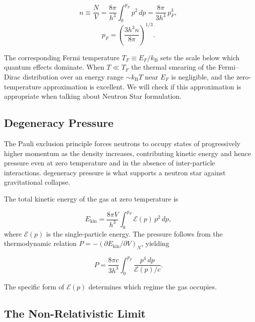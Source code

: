 \begin{equation}
    n \equiv \frac{N}{V}
      = \frac{8\pi}{h^3}\int_0^{p_F} p^2\,dp
      = \frac{8\pi}{3h^3}\,p_F^3,
    \label{eq:number-density}
\end{equation}
\begin{equation}
    p_F = \left(\frac{3h^3 n}{8\pi}\right)^{1/3}.
    \label{eq:fermi-momentum}
\end{equation}

The corresponding Fermi temperature $T_F \equiv E_F / k_{\mathrm{B}}$
sets the scale below which quantum effects dominate. When $T \ll T_F$
the thermal smearing of the Fermi--Dirac distribution over an energy
range ${\sim}k_{\mathrm{B}}T$ near $E_F$ is negligible, and the
zero-temperature approximation is excellent. We will check if this approximation is appropriate when talking about Neutron Star formulation.
 
\subsection{Degeneracy Pressure}
 
The Pauli exclusion principle forces neutrons to occupy states of
progressively higher momentum as the density increases, contributing
kinetic energy and hence pressure even at zero temperature and in the
absence of inter-particle interactions. degeneracy pressure
is what supports a neutron star against gravitational collapse.
 
The total kinetic energy of the gas at zero temperature is

\begin{equation}
    E_{\mathrm{kin}}
      = \frac{8\pi V}{h^3}\int_0^{p_F} \mathcal{E}(p)\,p^2\,dp,
    \label{eq:total-energy}
\end{equation}
%
where $\mathcal{E}(p)$ is the single-particle energy. The pressure
follows from the thermodynamic relation $P = -(\partial E_{\mathrm{kin}}/\partial V)_N$,
yielding

\begin{equation}
    P = \frac{8\pi c}{3h^3}\int_0^{p_F}
        \frac{p^4\,dp}{\mathcal{E}(p)/c}.
    \label{eq:pressure-general}
\end{equation}

The specific form of $\mathcal{E}(p)$ determines which regime the gas
occupies.

\subsection{The Non-Relativistic Limit}
 
